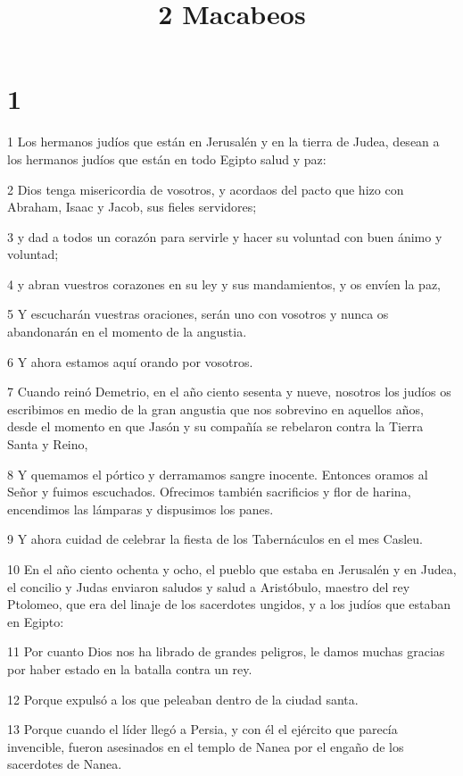 

\title{2 Macabeos}


\chapter{1}

\par 1 Los hermanos judíos que están en Jerusalén y en la tierra de Judea, desean a los hermanos judíos que están en todo Egipto salud y paz:
\par 2 Dios tenga misericordia de vosotros, y acordaos del pacto que hizo con Abraham, Isaac y Jacob, sus fieles servidores;
\par 3 y dad a todos un corazón para servirle y hacer su voluntad con buen ánimo y voluntad;
\par 4 y abran vuestros corazones en su ley y sus mandamientos, y os envíen la paz,
\par 5 Y escucharán vuestras oraciones, serán uno con vosotros y nunca os abandonarán en el momento de la angustia.
\par 6 Y ahora estamos aquí orando por vosotros.
\par 7 Cuando reinó Demetrio, en el año ciento sesenta y nueve, nosotros los judíos os escribimos en medio de la gran angustia que nos sobrevino en aquellos años, desde el momento en que Jasón y su compañía se rebelaron contra la Tierra Santa y Reino,
\par 8 Y quemamos el pórtico y derramamos sangre inocente. Entonces oramos al Señor y fuimos escuchados. Ofrecimos también sacrificios y flor de harina, encendimos las lámparas y dispusimos los panes.
\par 9 Y ahora cuidad de celebrar la fiesta de los Tabernáculos en el mes Casleu.
\par 10 En el año ciento ochenta y ocho, el pueblo que estaba en Jerusalén y en Judea, el concilio y Judas enviaron saludos y salud a Aristóbulo, maestro del rey Ptolomeo, que era del linaje de los sacerdotes ungidos, y a los judíos que estaban en Egipto:
\par 11 Por cuanto Dios nos ha librado de grandes peligros, le damos muchas gracias por haber estado en la batalla contra un rey.
\par 12 Porque expulsó a los que peleaban dentro de la ciudad santa.
\par 13 Porque cuando el líder llegó a Persia, y con él el ejército que parecía invencible, fueron asesinados en el templo de Nanea por el engaño de los sacerdotes de Nanea.
